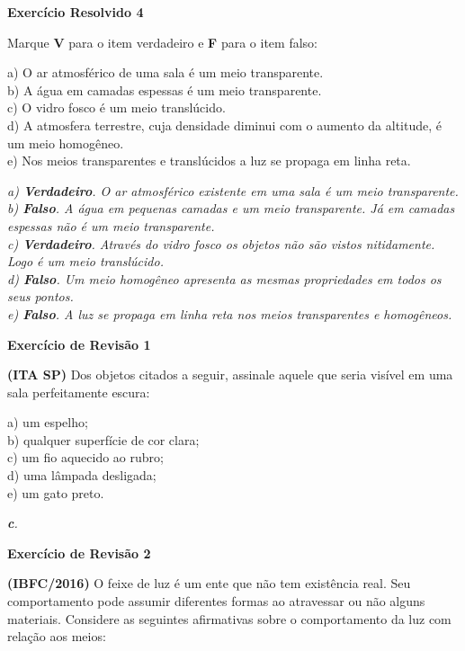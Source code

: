 \documentclass[11pt,twocolumn,oneside]{article}
\newenvironment{resposta*}
  {\bf Resposta:\\ }
  {}
\begin{document}
\textbf{Exercício Resolvido 4}


Marque \textbf{V} para o item verdadeiro e \textbf{F} para o item falso:


a) O ar atmosférico de uma sala é um meio transparente. \\
b) A água em camadas espessas é um meio transparente. \\
c) O vidro fosco é um meio translúcido. \\
d) A atmosfera terrestre, cuja densidade diminui com o aumento da altitude, é um meio homogêneo. \\
e) Nos meios transparentes e translúcidos a luz se propaga em linha reta.


\begin{resposta*}
{\it a) \textbf{Verdadeiro}. O ar atmosférico existente em uma sala é um meio transparente. \\
b) \textbf{Falso}. A água em pequenas camadas e um meio transparente. Já em camadas espessas não é um meio transparente. \\
c) \textbf{Verdadeiro}. Através do vidro fosco os objetos não são vistos nitidamente. Logo é um meio translúcido. \\
d) \textbf{Falso}. Um meio homogêneo apresenta as mesmas propriedades em todos os seus pontos. \\
e) \textbf{Falso}. A luz se propaga em linha reta nos meios transparentes e homogêneos.}
\end{resposta*}

\textbf{Exercício de Revisão 1}


\textbf{(ITA SP)} Dos objetos citados a seguir, assinale aquele que seria visível em uma sala perfeitamente escura:


a)	um espelho; \\
b)	qualquer superfície de cor clara; \\
c)	um fio aquecido ao rubro; \\
d)	uma lâmpada desligada; \\
e)	um gato preto.


\begin{resposta*}
{\it \textbf{c}.}
\end{resposta*}

\textbf{Exercício de Revisão 2}


\textbf{(IBFC/2016)} O feixe de luz é um ente que não tem existência real. Seu comportamento pode assumir diferentes formas ao atravessar ou não alguns materiais. Considere as seguintes afirmativas sobre o comportamento da luz com relação aos meios:
\end{document}
